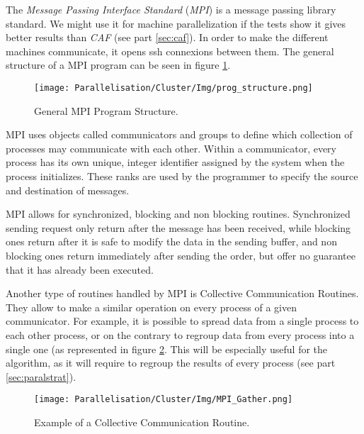 The \emph{Message Passing Interface Standard} (\emph{MPI}) is a message passing library standard.
We might use it for machine parallelization if the tests show it gives better results than \emph{CAF} (see part \ref{sec:caf}).
In order to make the different machines communicate, it opens ssh connexions between them.
The general structure of a MPI program can be seen in figure \ref{fig:mpi_struct}.

\begin{figure}[!h]
\centering
\texttt{[image: Parallelisation/Cluster/Img/prog\_structure.png]}
\caption{General MPI Program Structure. \cite{mpi_tuto}}
\label{fig:mpi_struct}
\end{figure}

MPI uses objects called communicators and groups to define which collection of processes may communicate with each other.
Within a communicator, every process has its own unique, integer identifier assigned by the system when the process initializes.
These ranks are used by the programmer to specify the source and destination of messages.

MPI allows for synchronized, blocking and non blocking routines.
Synchronized sending request only return after the message has been received, while blocking ones return after it is safe to modify the data in the sending buffer, and non blocking ones return immediately after sending the order, but offer no guarantee that it has already been executed.

Another type of routines handled by MPI is Collective Communication Routines.
They allow to make a similar operation on every process of a given communicator.
For example, it is possible to spread data from a single process to each other process, or on the contrary to regroup data from every process into a single one (as represented in figure \ref{fig:mpi_ccr}.
This will be especially useful for the algorithm, as it will require to regroup the results of every process (see part \ref{sec:paralstrat}).

\begin{figure}[!h]
\centering
\texttt{[image: Parallelisation/Cluster/Img/MPI\_Gather.png]}
\caption{Example of a Collective Communication Routine. \cite{mpi_tuto}}
\label{fig:mpi_ccr}
\end{figure}